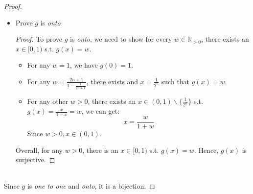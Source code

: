 \documentclass{article}
\begin{document}
\begin{proof}
\begin{itemize}
\begin{proof}
            \\
            If \( x_1, x_2 \notin \left\{ \frac{1}{2^n} \right\} \), then \( g(x_1) = \frac{x_1}{1 - x_1} \) and \( g(x_2) = \frac{x_2}{1 - x_2} \).
            Since \( x_1 \neq x_2 \), \( \frac{x_1}{1 - x_1} \neq \frac{x_2}{1 - x_2} \). Hence, \( g(x_1) \neq g(x_2) \).
            \\
            Combining all cases, $g(x)$ is injective.
        \end{proof}
        \item Prove $g$ is \textit{onto}
        \begin{proof}
            To prove $g$ is \textit{onto}, we need to show for every $w \in \mathbb{R}_{>0}$, there exists an $x \in [0,1)$ s.t. $g(x) = w$.
            \\
            \begin{itemize}
                \item For any $w = 1$, we have $g(0) = 1$.
                \item For any $w = \frac{2n+1}{1-\frac{1}{2n+1}}$, there exists and $x = \frac{1}{2^n}$ such that $g(x) = w$.
                \item For any other $w > 0$, there exists an $x \in (0,1) \backslash \{\frac{1}{2^n}\}$ s.t. $g(x) = \frac{x}{1 - x} = w$, we can get:
                \[ x = \frac{w}{1 + w} \]
                Since $w > 0, x \in (0,1)$.
            \end{itemize}
            Overall, for any $w > 0$, there is an $x \in [0,1)$ s.t. $g(x) = w$. Hence, $g(x)$ is surjective.
        \end{proof}
    \end{itemize}
    \\
    Since $g$ is \textit{one to one} and \textit{onto}, it is a bijection.
\end{proof}
\end{document}

